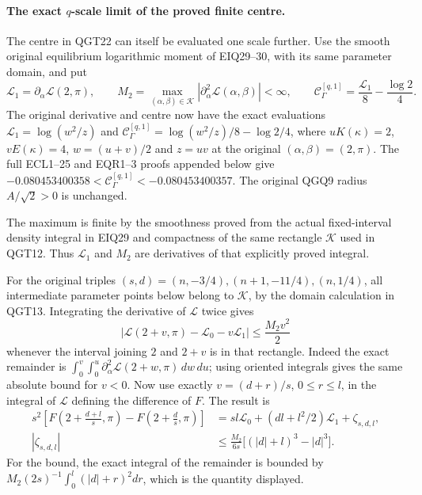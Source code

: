 \documentclass[11pt,a4paper]{article}
\begin{document}
\paragraph{The exact \(q\)-scale limit of the proved finite centre.}
The centre in QGT22 can itself be evaluated one scale further.
Use the smooth original equilibrium logarithmic moment of EIQ29--30,
with its same parameter domain, and put
\[
 \mathcal L_1=\partial_\alpha\mathcal L(2,\pi),\qquad
 M_2=\max_{(\alpha,\beta)\in\mathcal K}
                 |\partial_\alpha^2\mathcal L(\alpha,\beta)|<\infty,
 \qquad
 \mathcal C_\Gamma^{[q,1]}=\frac{\mathcal L_1}{8}
                              -\frac{\log2}{4}.
 \tag{QGQ4}
\]
The original derivative and centre now have the exact evaluations
$\mathcal L_1=\log(w^2/z)$ and
$\mathcal C_\Gamma^{[q,1]}=\log(w^2/z)/8-\log2/4$,
where $uK(\kappa)=2$, $vE(\kappa)=4$, $w=(u+v)/2$ and $z=uv$
at the original $(\alpha,\beta)=(2,\pi)$.
The full ECL1--25 and EQR1--3 proofs appended below give
$-0.080453400358<\mathcal C_\Gamma^{[q,1]}<-0.080453400357$.
The original QGQ9 radius $A/\sqrt2>0$ is unchanged.

The maximum is finite by the smoothness proved from the actual
fixed-interval density integral in EIQ29 and compactness of the same
rectangle $\mathcal K$ used in QGT12. Thus $\mathcal L_1$ and $M_2$
are derivatives of that explicitly proved integral.

For the original triples
$(s,d)=(n,-3/4),(n+1,-11/4),(n,1/4)$, all intermediate parameter
points below belong to $\mathcal K$, by the domain calculation in
QGT13. Integrating the derivative of $\mathcal L$ twice gives
\[
 \left|\mathcal L(2+v,\pi)-\mathcal L_0-v\mathcal L_1\right|
                       \le\frac{M_2v^2}{2}
\]
whenever the interval joining $2$ and $2+v$ is in that rectangle.
Indeed the exact remainder is
$\int_0^v\int_0^u\partial_\alpha^2\mathcal L(2+w,\pi)\,dw\,du$;
using oriented integrals gives the same absolute bound for $v<0$.
Now use exactly $v=(d+r)/s$, $0\le r\le l$, in the integral
of $\mathcal L$ defining the difference of $F$. The result is
\[
\begin{split}
 s^2\!\left[F\left(2+\frac{d+l}s,\pi\right)
              -F\left(2+\frac ds,\pi\right)\right]
   &=sl\mathcal L_0+(dl+l^2/2)\mathcal L_1+\zeta_{s,d,l},\\
 |\zeta_{s,d,l}|
   &\le\frac{M_2}{6s}\bigl[(|d|+l)^3-|d|^3\bigr].
\end{split}
 \tag{QGQ5}
\]
For the bound, the exact integral of the remainder is bounded by
$M_2(2s)^{-1}\int_0^l(|d|+r)^2dr$, which is the quantity displayed.
\end{document}

